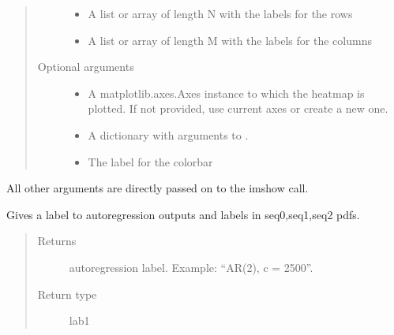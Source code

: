 \documentclass[letterpaper,10pt,english]{sphinxmanual}
\begin{document}
\begin{fulllineitems}
\begin{quote}
\begin{description}
\begin{itemize}
\item {} 
\sphinxAtStartPar
{} \textendash{} A list or array of length N with the labels
for the rows

\item {} 
\sphinxAtStartPar
{} \textendash{} A list or array of length M with the labels
for the columns

\end{itemize}

\item[{Optional arguments}] \leavevmode\begin{itemize}
\item {} 
\sphinxAtStartPar
{} \textendash{} A matplotlib.axes.Axes instance to which the heatmap
is plotted. If not provided, use current axes or
create a new one.

\item {} 
\sphinxAtStartPar
{} \textendash{} A dictionary with arguments to
.

\item {} 
\sphinxAtStartPar
{} \textendash{} The label for the colorbar

\end{itemize}

\end{description}\end{quote}

\sphinxAtStartPar
All other arguments are directly passed on to the imshow call.

\end{fulllineitems}


\begin{fulllineitems}
\label{\detokenize{LDS:LDS.OnlineLDS_library.lab}}
\sphinxAtStartPar
Gives a label to auto\sphinxhyphen{}regression outputs and labels in seq0,seq1,seq2 pdfs.
\begin{quote}\begin{description}
\item[{Returns}] \leavevmode
\sphinxAtStartPar
auto\sphinxhyphen{}regression label. Example: “AR(2), c = 2500”.

\item[{Return type}] \leavevmode
\sphinxAtStartPar
lab1

\end{description}\end{quote}

\end{fulllineitems}
\end{document}
